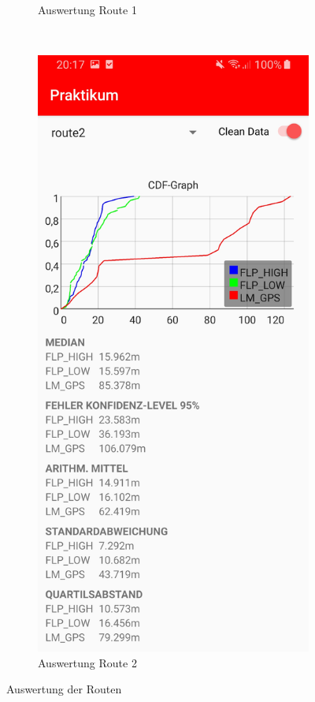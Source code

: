 \begin{figure}[h!]
\begin{subfigure}[b]{0.4\textwidth}
        \caption{Auswertung Route 1}
        \label{fig:auswertung1}
    \end{subfigure}
    ~ %
    \begin{subfigure}[b]{0.4\textwidth}
        \includegraphics[width=\textwidth]{screenshot_route2}
        \caption{Auswertung Route 2}
        \label{fig:auswertung2}
    \end{subfigure}
    \caption{Auswertung der Routen}
    \label{fig:auswertung}
\end{figure}

